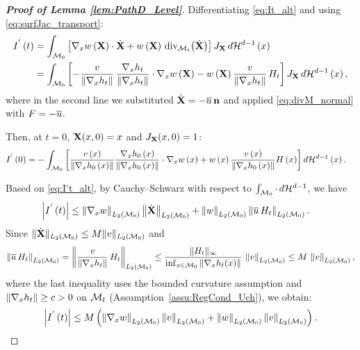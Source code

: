 \documentclass[12pt,american]{article}
\theoremstyle{definition}
\theoremstyle{plain}
\theoremstyle{definition}
\theoremstyle{plain}
\theoremstyle{plain}
\theoremstyle{plain}
\theoremstyle{plain}
\theoremstyle{plain}
\newcommand{\norm}[1]{\left\| #1 \right\|}
\begin{document}
\begin{proof}[\textbf{Proof of Lemma \ref{lem:PathD_Level}}]
Differentiating \eqref{eq:It_alt} and using \eqref{eq:surfJac_transport}:
\begin{align}
I^{'}\left(t\right)
&=\int_{{\cal M}_{0}}\left[\Dif_{x}w\left({\bf X}\right)\cd\dot{{\bf X}}
  +w\left({\bf X}\right)\,\text{div}_{{\cal M}_{t}}\!\left(\dot{{\bf X}}\right)\right]
  J_{{\bf X}}\,d{\cal H}^{d-1}\left(x\right) \nonumber\\
&=\int_{{\cal M}_{0}}\left[
  -\frac{v}{\norm{\Dif_{x}h_{t}}}\,\frac{\Dif_{x}h_{t}}{\norm{\Dif_{x}h_{t}}}\cd\Dif_{x}w\left({\bf X}\right)
  -w\left({\bf X}\right)\frac{v}{\norm{\Dif_{x}h_{t}}}\,H_t
  \right]J_{{\bf X}}\,d{\cal H}^{d-1}\left(x\right),
\label{eq:I't_alt}
\end{align}
where in the second line we substituted $\dot{{\bf X}}=-\overline{u}\,{\bf n}$
and applied \eqref{eq:divM_normal} with $F=-\overline{u}$.

Then, at $t=0$, ${\bf X}(x,0)=x$ and $J_{{\bf X}}(x,0)=1$:
\begin{align}
I^{'}\left(0\right)
&=-\int_{{\cal M}_{0}}\left[
\frac{v\left(x\right)}{\norm{\Dif_{x}h_{0}\left(x\right)}}
\frac{\Dif_{x}h_{0}\left(x\right)}{\norm{\Dif_{x}h_{0}\left(x\right)}}\cd\Dif_{x}w\left(x\right)
+w\left(x\right)\frac{v\left(x\right)}{\norm{\Dif_{x}h_{0}\left(x\right)}}
H\left(x\right)\right]d{\cal H}^{d-1}\left(x\right).
\label{eq:I0_alt}
\end{align}

Based on \eqref{eq:I't_alt}, by Cauchy--Schwarz with respect to $\int_{{\cal M}_0}\cdot\,d{\cal H}^{d-1}$, we have
\begin{align*}
\left|I^{'}\left(t\right)\right|
&\leq \norm{\Dif_{x}w}_{L_2(\cM_0)}\norm{\dot{{\bf X}}}_{L_2(\cM_0)}
  +\norm{w}_{L_2(\cM_0)}\norm{\ol u\,H_t}_{L_2(\cM_0)}.
\end{align*}
Since $\|\dot{{\bf X}}\|_{L_2(\mathcal{M}_0)}\leq M\|v\|_{L_2(\mathcal{M}_0)}$
and
\[
\norm{\ol u\,H_t}_{L_2(\cM_0)}
=\norm{\frac{v}{\norm{\Dif_{x}h_t}}\,H_t}_{L_2(\cM_0)}
\leq \frac{\|H_t\|_\infty}{\inf_{x\in{\cal M}_0}\norm{\Dif_{x}h_t(x)}}\,\norm{v}_{L_2(\cM_0)}
\leq M\,\norm{v}_{L_2(\cM_0)},
\]
where the last inequality uses the bounded curvature assumption and
$\norm{\Dif_{x}h_t}\geq c>0$ on ${\cal M}_t$ (Assumption~\ref{assu:RegCond_Uch}), we obtain:
\begin{equation}\label{eq:bound_I't_alt}
\left|I^{'}\left(t\right)\right|
\leq M\left(\norm{\Dif_{x}w}_{L_2(\cM_0)}\norm{v}_{L_2(\cM_0)}
+\norm{w}_{L_2(\cM_0)}\norm{v}_{L_2(\cM_0)}\right).
\end{equation}

\end{proof}
\end{document}
